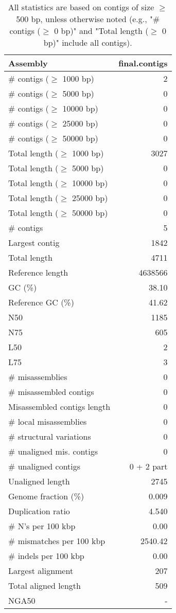 \documentclass[12pt,a4paper]{article}
\begin{document}
\begin{table}[ht]
\begin{center}
\caption{All statistics are based on contigs of size $\geq$ 500 bp, unless otherwise noted (e.g., "\# contigs ($\geq$ 0 bp)" and "Total length ($\geq$ 0 bp)" include all contigs).}
\begin{tabular}{|l*{1}{|r}|}
\hline
Assembly & final.contigs \\ \hline
\# contigs ($\geq$ 1000 bp) & 2 \\ \hline
\# contigs ($\geq$ 5000 bp) & 0 \\ \hline
\# contigs ($\geq$ 10000 bp) & 0 \\ \hline
\# contigs ($\geq$ 25000 bp) & 0 \\ \hline
\# contigs ($\geq$ 50000 bp) & 0 \\ \hline
Total length ($\geq$ 1000 bp) & 3027 \\ \hline
Total length ($\geq$ 5000 bp) & 0 \\ \hline
Total length ($\geq$ 10000 bp) & 0 \\ \hline
Total length ($\geq$ 25000 bp) & 0 \\ \hline
Total length ($\geq$ 50000 bp) & 0 \\ \hline
\# contigs & 5 \\ \hline
Largest contig & 1842 \\ \hline
Total length & 4711 \\ \hline
Reference length & 4638566 \\ \hline
GC (\%) & 38.10 \\ \hline
Reference GC (\%) & 41.62 \\ \hline
N50 & 1185 \\ \hline
N75 & 605 \\ \hline
L50 & 2 \\ \hline
L75 & 3 \\ \hline
\# misassemblies & 0 \\ \hline
\# misassembled contigs & 0 \\ \hline
Misassembled contigs length & 0 \\ \hline
\# local misassemblies & 0 \\ \hline
\# structural variations & 0 \\ \hline
\# unaligned mis. contigs & 0 \\ \hline
\# unaligned contigs & 0 + 2 part \\ \hline
Unaligned length & 2745 \\ \hline
Genome fraction (\%) & 0.009 \\ \hline
Duplication ratio & 4.540 \\ \hline
\# N's per 100 kbp & 0.00 \\ \hline
\# mismatches per 100 kbp & 2540.42 \\ \hline
\# indels per 100 kbp & 0.00 \\ \hline
Largest alignment & 207 \\ \hline
Total aligned length & 509 \\ \hline
NGA50 & - \\ \hline
\end{tabular}
\end{center}
\end{table}
\end{document}
